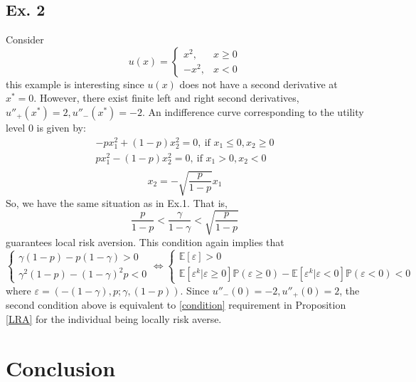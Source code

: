 \documentclass[a4paper]{article}
\newcommand{\prob}{\mathbb{P}}
\newcommand{\expect}{\mathbb{E}}
\newcommand{\eps}{\varepsilon}
\begin{document}
\subsection{Ex. 2}
Consider $$u(x) = \begin{cases}
	x^2, &x \ge 0\\-x^2, &x < 0
\end{cases}$$
this example is interesting since $u(x)$ does not have a second derivative at $x^* = 0$. However, there exist finite left and right second derivatives, $u''_{+}(x^*) = 2, u''_{-}(x^*) = -2$. An indifference curve corresponding to the utility level 0 is given by:
\begin{align*}
	-px_1^2 + (1-p)x_2^2 = 0,\ \text{if } x_1 \le 0, x_2 \ge 0\\
	px_1^2-(1-p)x_2^2 = 0,\ \text{if } x_1 > 0, x_2 < 0\\
\end{align*}
$$	x_2 = -\sqrt{\frac{p}{1-p}}x_1$$
So, we have the same situation as in Ex.1. That is, $$\frac{p}{1-p}<\frac{\gamma}{1-\gamma}<\sqrt{\frac{p}{1-p}}$$ guarantees local risk aversion. This condition again implies that $$\begin{cases}
	\gamma(1-p)-p(1-\gamma)>0\\
	\gamma^2(1-p) - (1-\gamma)^2p < 0
\end{cases} \iff \begin{cases}
\expect[\eps]>0\\
\expect[ \eps^k | \eps\ge0]\prob(\eps\ge0) -\expect[ \eps^k | \eps<0]\prob(\eps<0) < 0
\end{cases}$$
where $\eps = (-(1-\gamma), p; \gamma, (1-p))$. Since $u''_{-}(0) = -2, u''_{+}(0)=2$, the second condition above is equivalent to \eqref{condition} requirement in Proposition \ref{LRA} for the individual being locally risk averse.
\section{Conclusion}
	\newpage
	{}
	
	
\end{document}
